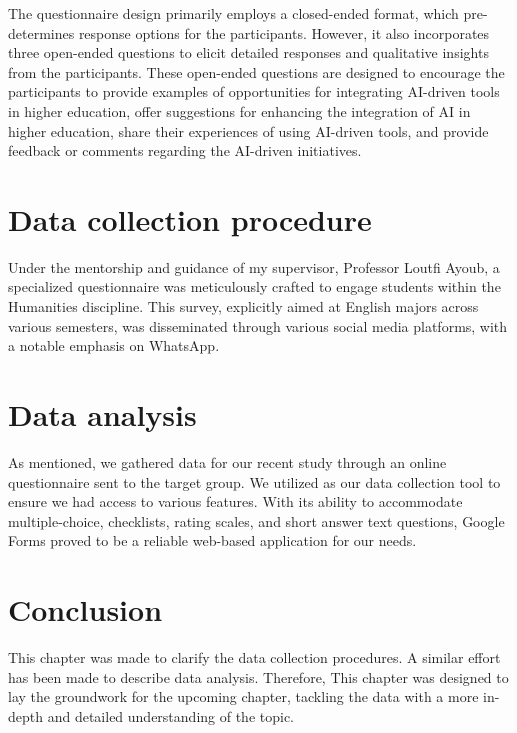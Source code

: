 The questionnaire design primarily employs a closed-ended format,
which pre-determines response options for the participants. However,
it also incorporates three open-ended questions to elicit detailed
responses and qualitative insights from the participants. These
open-ended questions are designed to encourage the participants
to provide examples of opportunities for integrating AI-driven
tools in higher education, offer suggestions for enhancing the integration
of AI in higher education, share their experiences of using AI-driven tools,
and provide feedback or comments regarding the AI-driven initiatives.
\section{Data collection procedure}
Under the mentorship and guidance of my supervisor, Professor Loutfi Ayoub,
a specialized questionnaire was meticulously crafted to engage students within
the Humanities discipline. This survey, explicitly aimed at English majors across
various semesters, was disseminated through various social media platforms,
with a notable emphasis on WhatsApp.
\section{Data analysis}
As mentioned, we gathered data for our recent study through an online
questionnaire sent to the target group. We utilized  as
our data collection tool to ensure we had access to various features.
With its ability to accommodate multiple-choice, checklists, rating
scales, and short answer text questions, Google Forms proved to
be a reliable web-based application for our needs.
\section{Conclusion}
This chapter was made to clarify the data collection procedures.
A similar effort has been made to describe data analysis.
Therefore, This chapter was designed to lay the groundwork
for the upcoming chapter, tackling the data with a
more in-depth and detailed understanding of the topic.
